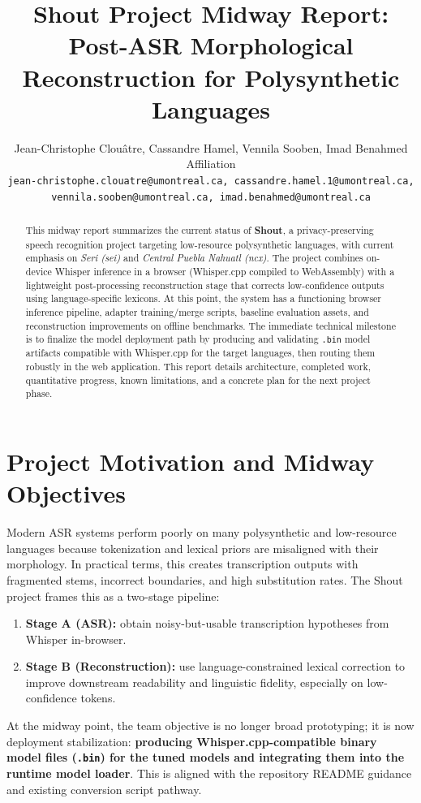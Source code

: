 \documentclass[11pt]{article}
\title{Shout Project Midway Report: Post-ASR Morphological Reconstruction for Polysynthetic Languages}
\author{Jean-Christophe Clouâtre, Cassandre Hamel, Vennila Sooben, Imad Benahmed \\
Affiliation\\
\texttt{jean-christophe.clouatre@umontreal.ca, cassandre.hamel.1@umontreal.ca,}\\
\texttt{vennila.sooben@umontreal.ca, imad.benahmed@umontreal.ca}}
\begin{document}
\maketitle

\begin{abstract}
This midway report summarizes the current status of \textbf{Shout}, a privacy-preserving speech recognition project targeting low-resource polysynthetic languages, with current emphasis on \textit{Seri (sei)} and \textit{Central Puebla Nahuatl (ncx)}. The project combines on-device Whisper inference in a browser (Whisper.cpp compiled to WebAssembly) with a lightweight post-processing reconstruction stage that corrects low-confidence outputs using language-specific lexicons. At this point, the system has a functioning browser inference pipeline, adapter training/merge scripts, baseline evaluation assets, and reconstruction improvements on offline benchmarks. The immediate technical milestone is to finalize the model deployment path by producing and validating \texttt{.bin} model artifacts compatible with Whisper.cpp for the target languages, then routing them robustly in the web application. This report details architecture, completed work, quantitative progress, known limitations, and a concrete plan for the next project phase.
\end{abstract}



\section{Project Motivation and Midway Objectives}
Modern ASR systems perform poorly on many polysynthetic and low-resource languages because tokenization and lexical priors are misaligned with their morphology. In practical terms, this creates transcription outputs with fragmented stems, incorrect boundaries, and high substitution rates. The Shout project frames this as a two-stage pipeline:
\begin{enumerate}
    \item \textbf{Stage A (ASR):} obtain noisy-but-usable transcription hypotheses from Whisper in-browser.
    \item \textbf{Stage B (Reconstruction):} use language-constrained lexical correction to improve downstream readability and linguistic fidelity, especially on low-confidence tokens.
\end{enumerate}

At the midway point, the team objective is no longer broad prototyping; it is now deployment stabilization: \textbf{producing Whisper.cpp-compatible binary model files (\texttt{.bin}) for the tuned models and integrating them into the runtime model loader}. This is aligned with the repository README guidance and existing conversion script pathway.
\end{document}

